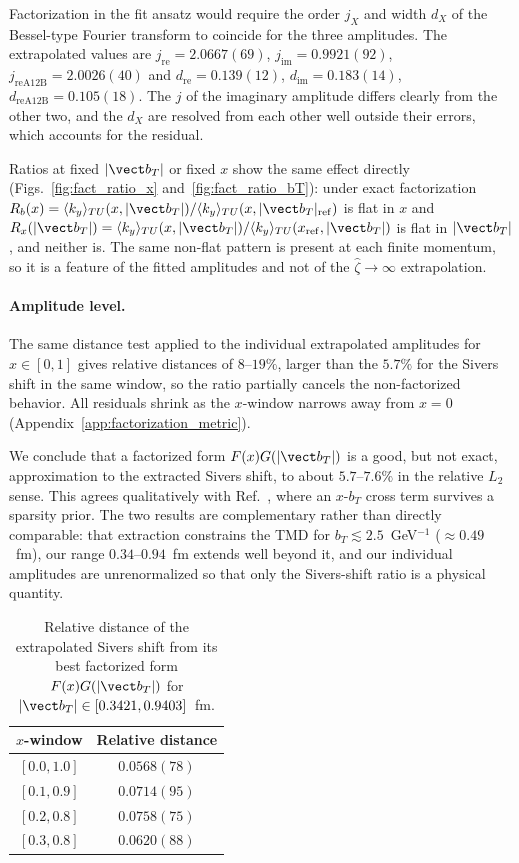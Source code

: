 Factorization in the fit ansatz would require the order $j_X$ and width $d_X$ of the Bessel-type Fourier transform to coincide for the three amplitudes. The extrapolated values are $j_{\text{re}}=2.0667(69)$, $j_{\text{im}}=0.9921(92)$, $j_{\text{reA12B}}=2.0026(40)$ and $d_{\text{re}}=0.139(12)$, $d_{\text{im}}=0.183(14)$, $d_{\text{reA12B}}=0.105(18)$. The $j$ of the imaginary amplitude differs clearly from the other two, and the $d_X$ are resolved from each other well outside their errors, which accounts for the residual.

Ratios at fixed $|\vect b_T|$ or fixed $x$ show the same effect directly (Figs.~\ref{fig:fact_ratio_x} and~\ref{fig:fact_ratio_bT}): under exact factorization $R_b(x)=\langle k_y\rangle_{TU}(x,|\vect b_T|)/\langle k_y\rangle_{TU}(x,|\vect b_T|_{\rm ref})$ is flat in $x$ and $R_x(|\vect b_T|)=\langle k_y\rangle_{TU}(x,|\vect b_T|)/\langle k_y\rangle_{TU}(x_{\rm ref},|\vect b_T|)$ is flat in $|\vect b_T|$, and neither is. The same non-flat pattern is present at each finite momentum, so it is a feature of the fitted amplitudes and not of the $\hat\zeta\to\infty$ extrapolation.

\paragraph{Amplitude level.}
The same distance test applied to the individual extrapolated amplitudes for $x\in[0,1]$ gives relative distances of $8$--$19\%$, larger than the $5.7\%$ for the Sivers shift in the same window, so the ratio partially cancels the non-factorized behavior. All residuals shrink as the $x$-window narrows away from $x=0$ (Appendix~\ref{app:factorization_metric}).

We conclude that a factorized form $F(x)G(|\vect b_T|)$ is a good, but not exact, approximation to the extracted Sivers shift, to about $5.7$--$7.6\%$ in the relative $L_2$ sense. This agrees qualitatively with Ref.~\cite{Granger:2026symb}, where an $x$-$b_T$ cross term survives a sparsity prior. The two results are complementary rather than directly comparable: that extraction constrains the TMD for $b_T\lesssim2.5$~GeV$^{-1}$ ($\approx0.49$~fm), our range $0.34$--$0.94$~fm extends well beyond it, and our individual amplitudes are unrenormalized so that only the Sivers-shift ratio is a physical quantity.

\begin{table}
\caption{Relative distance of the extrapolated Sivers shift from its best factorized form $F(x)G(|\vect b_T|)$ for $|\vect b_T|\in[0.3421,0.9403]$~fm.}
\label{tab:fact_sivers}
\begin{ruledtabular}
\begin{tabular}{cc}
$x$-window & Relative distance \\
\hline
$[0.0,1.0]$ & $0.0568(78)$ \\
$[0.1,0.9]$ & $0.0714(95)$ \\
$[0.2,0.8]$ & $0.0758(75)$ \\
$[0.3,0.8]$ & $0.0620(88)$ \\
\end{tabular}
\end{ruledtabular}
\end{table}


